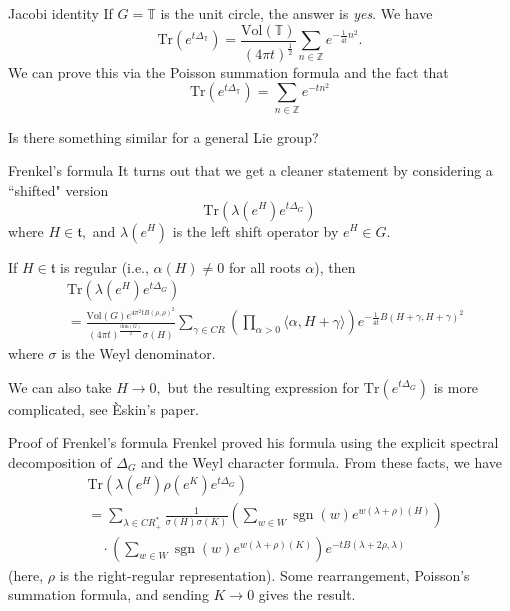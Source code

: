 \documentclass{beamer}
\numberwithin{equation}{section}
\theoremstyle{plain}
\theoremstyle{plain}
\theoremstyle{definition}
\theoremstyle{plain}
\theoremstyle{plain}
\theoremstyle{definition}
\newcommand{\Itgr}{\mathbb{Z}}
\newcommand{\Circ}{\mathbb{T}}
\newcommand{\Tr}{\mathrm{Tr}}
\newcommand{\sgn}{\operatorname{sgn}}
\newcommand{\tf}{\mathfrak{t}}
\begin{document}
\begin{frame}{Jacobi identity}
  If $G = \Circ$ is the unit circle, the answer is \emph{yes}. We have
  \[
    \Tr(e^{t\Delta_{\Circ}}) = \frac{\mathrm{Vol}(\Circ)}{(4\pi t)^{\frac12}}\sum_{n\in \Itgr} e^{-\frac{1}{4t}n^2}.
  \]
  We can prove this via the Poisson summation formula and the fact that
  \[
    \Tr(e^{t\Delta_{\Circ}}) = \sum_{n\in \Itgr} e^{-tn^2}
  \]
  
  Is there something similar for a general Lie group?
\end{frame}

\begin{frame}{Frenkel's formula}
  It turns out that we get a cleaner statement by considering a ``shifted" version
  \[
    \Tr(\lambda(e^H)e^{t\Delta_G})
  \]
  where $H\in \tf,$ and $\lambda(e^H)$ is the left shift operator by $e^H\in G.$
  \begin{theorem}
      If $H\in \tf$ is regular (i.e., $\alpha(H)\neq 0$ for all roots $\alpha$), then
      \begin{align*}
          &\Tr(\lambda(e^H)e^{t\Delta_G})\\
          &= \frac{\mathrm{Vol}(G)e^{4\pi^2tB(\rho,\rho)^2}}{(4\pi t)^{\frac{\mathrm{dim}(G)}{2}}\sigma(H)}\sum_{\gamma \in CR} \left(\prod_{\alpha>0} \langle \alpha,H+\gamma\rangle\right) e^{-\frac{1}{4t}B(H+\gamma,H+\gamma)^2}
      \end{align*}
      where $\sigma$ is the Weyl denominator.
  \end{theorem}
  \pause
  We can also take $H\to 0,$ but the resulting expression for $\Tr(e^{t\Delta_G})$ is more complicated, see \`{E}skin's paper.
\end{frame}

\begin{frame}{Proof of Frenkel's formula}
    Frenkel proved his formula using the explicit spectral decomposition of $\Delta_G$ and the Weyl character formula. From these facts, we have
    \begin{align*}
      &\Tr(\lambda(e^H)\rho(e^K)e^{t\Delta_G})\\ 
      &= \sum_{\lambda \in CR^*_+} \frac{1}{\sigma(H)\sigma(K)}\left(\sum_{w \in W} \sgn(w)e^{w(\lambda+\rho)(H)}\right)\\
      &\quad \cdot \left(\sum_{w\in W} \sgn(w)e^{w(\lambda+\rho)(K)}\right)e^{-tB(\lambda+2\rho,\lambda)}
    \end{align*}
    (here, $\rho$ is the right-regular representation).
    Some rearrangement, Poisson's summation formula, and sending $K\to 0$ gives the result.
\end{frame}
\end{document}

